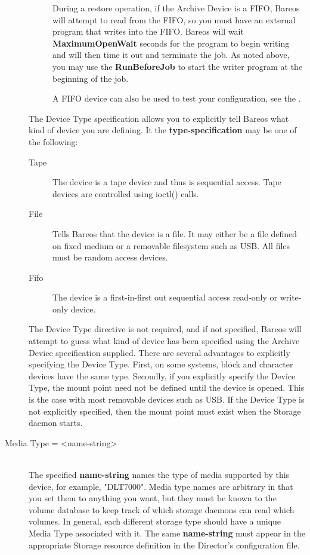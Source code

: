 \begin{description}
\begin{description}
During a restore operation, if the Archive Device is a FIFO, Bareos  will
attempt to read from the FIFO, so you must have an external program  that
writes into the FIFO. Bareos will wait {\bf MaximumOpenWait} seconds  for the
program to begin writing and will then time it out and  terminate the job. As
noted above, you may use the {\bf RunBeforeJob}  to start the writer program
at the beginning of the job.

A FIFO device can also be used to test your configuration, see the .
\end{description}


The Device Type specification allows you to explicitly tell Bareos
what kind of device you are defining. It the {\bf type-specification}
may be one of the following:
\begin{description}
\item [Tape]
  The device is a tape device and thus is sequential access. Tape devices
  are controlled using ioctl() calls.
\item [File]
  Tells Bareos that the device is a file. It may either be a
  file defined on fixed medium or a removable filesystem such as
  USB.  All files must be random access devices.
\item [Fifo]
  The device is a first-in-first out sequential access read-only
  or write-only device.
\end{description}

The Device Type directive is not required, and if not specified, Bareos
will attempt to guess what kind of device has been specified using the
Archive Device specification supplied. There are several advantages to
explicitly specifying the Device Type. First, on some systems, block and
character devices have the same type.
Secondly, if you explicitly specify the Device Type, the mount point
need not be defined until the device is opened. This is the case with
most removable devices such as USB.
If the Device Type is not explicitly specified, then the mount point
must exist when the Storage daemon starts.



\item [Media Type = {\textless}name-string{\textgreater}] \hfill \\
The specified {\bf name-string} names the type of media supported by this
device, for example, "DLT7000".  Media type names are arbitrary in that you
set them to anything you want, but they must be known to the volume
database to keep track of which storage daemons can read which volumes.  In
general, each different storage type should have a unique Media Type
associated with it.  The same {\bf name-string} must appear in the
appropriate Storage resource definition in the Director's configuration
file.


\end{description}
